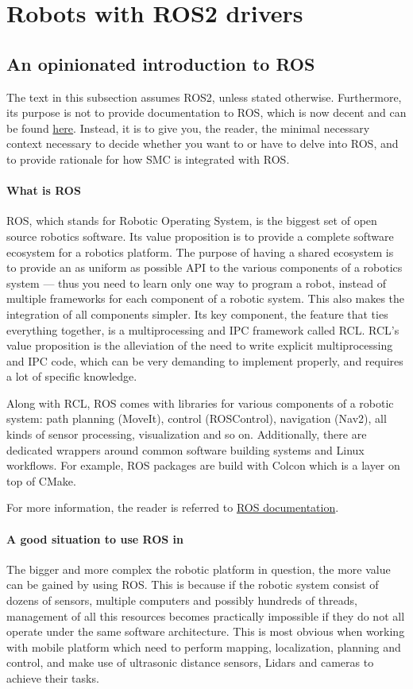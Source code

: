 \section{Robots with ROS2 drivers}
\label{sec-ros2}
\subsection{An opinionated introduction to ROS}
The text in this subsection assumes ROS2, unless stated otherwise.
Furthermore, its purpose is not to provide documentation to ROS,
which is now decent and can be found \href{https://docs.ros.org/}{here}.
Instead, it is to give you, the reader, the minimal necessary context
necessary to decide whether you want to or have to delve into ROS,
and to provide rationale for how SMC is integrated with ROS.

\paragraph{What is ROS}
ROS, which stands for Robotic Operating System, is the biggest
set of open source robotics software.
Its value proposition is to provide a complete software ecosystem
for a robotics platform. The purpose of having a shared ecosystem
is to provide an as uniform as possible API to the various
components of a robotics system --- thus you need to learn 
only one way to program a robot,
instead of multiple frameworks for each component of a robotic system.
This also makes the integration of all components simpler.
Its key component, the feature
that ties everything together, is a multiprocessing and IPC 
framework called RCL. RCL's value proposition is the alleviation
of the need to write explicit multiprocessing and IPC code,
which can be very demanding to implement properly,
and requires a lot of specific knowledge.


Along with RCL, ROS comes with libraries for various components
of a robotic system: path planning (MoveIt), control (ROSControl), navigation (Nav2), 
all kinds of sensor processing, visualization and so on.
Additionally, there are dedicated wrappers around common software building
systems and Linux workflows. For example, ROS packages are build with Colcon
which is a layer on top of CMake.

For more information, the reader is referred to \href{https://docs.ros.org/}{ROS documentation}.


\paragraph{A good situation to use ROS in}
The bigger and more complex the robotic platform in question, the more 
value can be gained by using ROS. This is because if the robotic system
consist of dozens of sensors, multiple computers and possibly hundreds of threads,
management of all this resources becomes practically impossible
if they do not all operate under the same software architecture. 
This is most obvious when working with mobile platform which need
to perform mapping, localization, planning and control,
and make use of ultrasonic distance sensors, Lidars and cameras 
to achieve their tasks.


